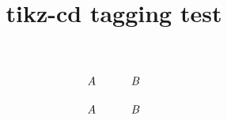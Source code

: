 \documentclass{article}
\title{tikz-cd tagging test}
\begin{document}
\[\begin{tikzcd}
  A & B
\end{tikzcd}\]

\[\begin{tikzcd}[ampersand replacement=\&]
  A \& B
\end{tikzcd}\]
\end{document}
